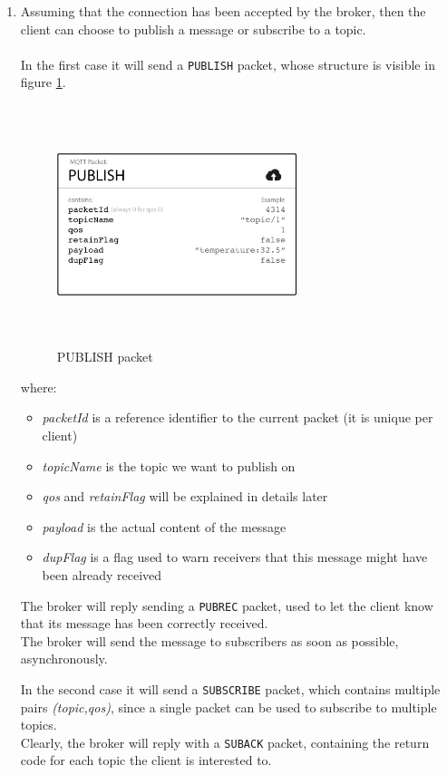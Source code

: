 \documentclass[12pt]{report}
\begin{document}
\begin{enumerate}
\item Assuming that the connection has been accepted by the broker, then the client can choose to publish a message or subscribe to a topic.\\\\
In the first case it will send a \texttt{PUBLISH} packet, whose structure is visible in figure \ref{fig:publishpacket}.

\begin{figure}[H]
\includegraphics[width=7cm,height=7cm,keepaspectratio]{publish_message}
\centering
\caption{PUBLISH packet}
\label{fig:publishpacket}
\end{figure}
where:

\begin{itemize}
\setlength{\itemindent}{+4mm}
\item \emph{packetId} is a reference identifier to the current packet (it is unique per client)
\item \emph{topicName} is the topic we want to publish on
\item \emph{qos} and \emph{retainFlag} will be explained in details later
\item \emph{payload} is the actual content of the message
\item \emph{dupFlag} is a flag used to warn receivers that this message might have been already received
\end{itemize}

The broker will reply sending a \texttt{PUBREC} packet, used to let the client know that its message has been correctly received.\\
The broker will send the message to subscribers as soon as possible, asynchronously.
\bigskip

In the second case it will send a \texttt{SUBSCRIBE} packet, which contains multiple pairs \emph{(topic,qos)}, since a single packet can be used to subscribe to multiple topics.\\
Clearly, the broker will reply with a \texttt{SUBACK} packet, containing the return code for each topic the client is interested to.


\end{enumerate}
\end{document}
